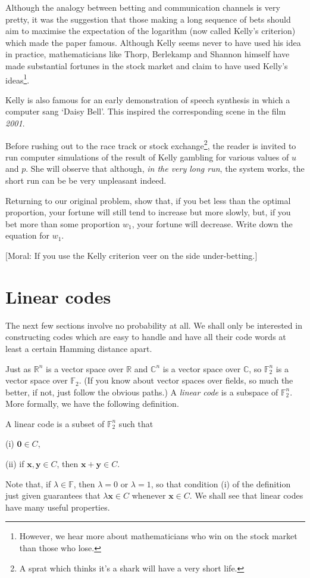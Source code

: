 Although the analogy between betting and communication
channels is very pretty, it was the suggestion that
those making a long sequence of bets should aim to
maximise the expectation of the logarithm 
(now called Kelly's criterion) which
made the paper famous. Although Kelly 
seems never to have used his idea in practice,
mathematicians like Thorp, Berlekamp and Shannon himself
have made substantial fortunes in the stock market
and claim to have used Kelly's ideas\footnote{However,
we hear more about mathematicians who win on the 
stock market than those who lose.}.

Kelly is also famous for an early demonstration of
speech synthesis in which a computer sang
`Daisy Bell'. This inspired the corresponding
scene in the film \emph{2001}.

Before rushing out to the race track or stock 
exchange\footnote{A sprat which thinks it's a shark
will have a very short life.},
the reader
is invited to run computer simulations of the result
of Kelly gambling for various values of $u$ and $p$.
She will observe that although, \emph{in the very long run},
the system works, the short run can be be very
unpleasant indeed.   
\begin{exercise}\label{E;Slow Kelly} 
Returning to our original problem, show that,
if you bet less than the optimal proportion, your fortune
will still tend to increase but more slowly, but, if you bet
more than some proportion $w_{1}$, your fortune will decrease.
Write down the equation for $w_{1}$.

$[$Moral: If you use the Kelly criterion veer on the side under-betting.$]$
\end{exercise}  
\section{Linear codes} The next few sections involve no
probability at all. We shall only be interested in constructing
codes which are easy to handle and have all their code words
at least a certain Hamming distance apart.

Just as ${\mathbb R}^{n}$ is a
vector space over ${\mathbb R}$ and
${\mathbb C}^{n}$ is a
vector space over ${\mathbb C}$, so
${\mathbb F}_{2}^{n}$ is a
vector space over ${\mathbb F}_{2}$.
(If you know about vector spaces over fields,
so much the better, if not, just follow
the obvious paths.)
A \emph{linear code} is a subspace of ${\mathbb F}_{2}^{n}$.
More formally, we have the following definition.
\begin{definition} A linear code is a subset of
${\mathbb F}_{2}^{n}$ such that

(i) ${\boldsymbol 0}\in C$,

(ii) if ${\mathbf x},{\mathbf y}\in C$,
then ${\mathbf x}+{\mathbf y}\in C$.
\end{definition}
Note that, if $\lambda\in{\mathbb F}$, then $\lambda=0$
or $\lambda=1$, so that condition (i) of the definition
just given guarantees that $\lambda{\mathbf x}\in C$
whenever ${\mathbf x}\in C$. We shall see that
linear codes have many useful properties.

